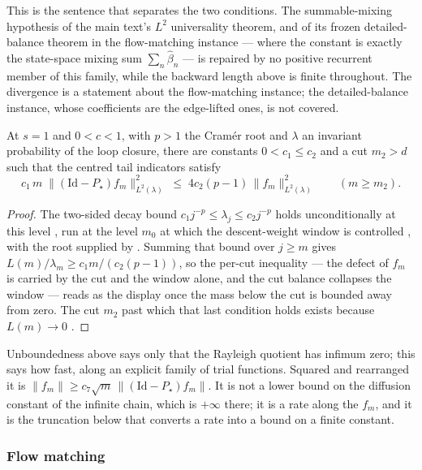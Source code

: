 \noindent This is the sentence that separates the two conditions. The summable-mixing hypothesis of the
main text's $L^2$ universality theorem, and of its frozen detailed-balance theorem in the
flow-matching instance --- where the constant is exactly the state-space mixing sum
$\sum_n\widehat\beta_n$ --- is repaired by no positive recurrent member of this family, while
the backward length above is finite throughout. The divergence is a statement about the
flow-matching instance; the detailed-balance instance, whose coefficients are the edge-lifted
ones, is not covered.


\begin{theorem}
  \label{thm:main_rate}
  \leanok
At $s=1$ and $0<c<1$, with $p>1$ the Cram\'er root and $\lambda$ an invariant probability of
the loop closure, there are constants $0<c_1\leq c_2$ and a cut $m_2>d$ such that the centred
tail indicators satisfy
\[ c_1\,m\;\bigl\|(\mathrm{Id}-P_\star)f_m\bigr\|^2_{L^2(\lambda)}
   \;\leq\; 4c_2(p-1)\,\|f_m\|^2_{L^2(\lambda)} \qquad (m\geq m_2). \]
\end{theorem}

\begin{proof}
  \leanok
The two-sided decay bound $c_1 j^{-p}\leq\lambda_j\leq c_2 j^{-p}$ holds unconditionally at
this level , run at the level $m_0$ at
which the descent-weight window is controlled , with the root
supplied by . Summing that bound over $j\geq m$ gives
$L(m)/\lambda_m\geq c_1m/(c_2(p-1))$, so the per-cut inequality --- the defect of $f_m$ is
carried by the cut and the window alone, and the cut balance collapses the window --- reads as
the display once the mass below the cut is bounded away from zero. The cut $m_2$ past which
that last condition holds exists because $L(m)\to0$
.
\end{proof}

\noindent Unboundedness above says only that the Rayleigh quotient has infimum zero; this says how fast,
along an explicit family of trial functions. Squared and rearranged it is
$\|f_m\|\geq c_7\sqrt m\,\|(\mathrm{Id}-P_\star)f_m\|$. It is not a lower bound on the
diffusion constant of the infinite chain, which is $+\infty$ there; it is a rate along the
$f_m$, and it is the truncation below that converts a rate into a bound on a finite constant.


\subsubsection{Flow matching}


